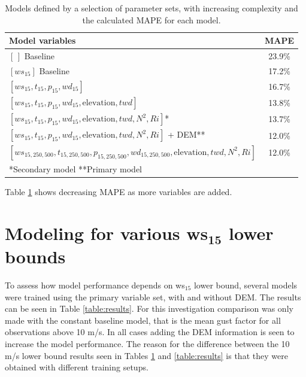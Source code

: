 \begin{table}[h]
  \caption[Model results for different sets of parameters.]{Models defined by a selection of parameter sets, with increasing complexity and the calculated MAPE for each model.}
    \label{table:setsOfParams}
    \centering
    \begin{tabular}{lc}
        \toprule
        Model variables & MAPE\\
        \midrule
        $[\,]$ Baseline & 23.9\%\\
        $[ws_{15}]$ Baseline & 17.2\%\\
        $[ws_{15}, t_{15}, p_{15}, wd_{15}]$ & 16.7\% \\
        $[ws_{15}, t_{15}, p_{15}, wd_{15}, \text{elevation}, twd]$ & 13.8\% \\
        $[ws_{15}, t_{15}, p_{15}, wd_{15}, \text{elevation}, twd, N^2, Ri]$* & 13.7\%\\
        $[ws_{15}, t_{15}, p_{15}, wd_{15}, \text{elevation}, twd, N^2, Ri]$ + DEM** & 12.0\%\\
        $[ws_{15,250,500}, t_{15,250,500}, p_{15,250,500}, wd_{15,250,500}, \text{elevation}, twd, N^2, Ri]$ & 12.0\% \\
        \bottomrule
        *\small{Secondary model}
        **\small{Primary model}
    \end{tabular}
\end{table}

Table \ref{table:setsOfParams} shows decreasing MAPE as more variables are added.

\section{Modeling for various ws$_\textbf{15}$ lower bounds}\label{sec:ws15_lower_bounds}
To assess how model performance depends on ws$_{15}$ lower bound, several models were trained using the primary variable set, with and without DEM. The results can be seen in Table \ref{table:results}. For this investigation comparison was only made with the constant baseline model, that is the mean gust factor for all observations above 10 m/s. In all cases adding the DEM information is seen to increase the model performance. The reason for the difference between the 10 m/s lower bound results seen in Tables \ref{table:setsOfParams} and \ref{table:results} is that they were obtained with different training setups. 

